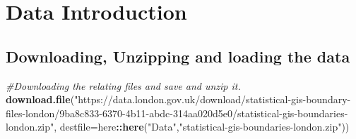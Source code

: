 \documentclass[
]{article}
\newenvironment{Shaded}{\begin{snugshade}}{\end{snugshade}}
\newcommand{\AttributeTok}[1]{\textcolor[rgb]{0.13,0.29,0.53}{#1}}
\newcommand{\CommentTok}[1]{\textcolor[rgb]{0.56,0.35,0.01}{\textit{#1}}}
\newcommand{\FunctionTok}[1]{\textcolor[rgb]{0.13,0.29,0.53}{\textbf{#1}}}
\newcommand{\NormalTok}[1]{#1}
\newcommand{\SpecialCharTok}[1]{\textcolor[rgb]{0.81,0.36,0.00}{\textbf{#1}}}
\newcommand{\StringTok}[1]{\textcolor[rgb]{0.31,0.60,0.02}{#1}}
\begin{document}
\hypertarget{data-introduction}{%
\section{Data Introduction}\label{data-introduction}}

\hypertarget{downloading-unzipping-and-loading-the-data}{%
\subsection{Downloading, Unzipping and loading the
data}\label{downloading-unzipping-and-loading-the-data}}

\begin{Shaded}
\begin{Highlighting}[]
\CommentTok{\#Downloading the relating files and save and unzip it.}
\FunctionTok{download.file}\NormalTok{(}\StringTok{"https://data.london.gov.uk/download/statistical{-}gis{-}boundary{-}files{-}london/9ba8c833{-}6370{-}4b11{-}abdc{-}314aa020d5e0/statistical{-}gis{-}boundaries{-}london.zip"}\NormalTok{, }
              \AttributeTok{destfile=}\NormalTok{here}\SpecialCharTok{::}\FunctionTok{here}\NormalTok{(}\StringTok{"Data"}\NormalTok{,}\StringTok{"statistical{-}gis{-}boundaries{-}london.zip"}\NormalTok{))}
\end{Highlighting}
\end{Shaded}
\end{document}
